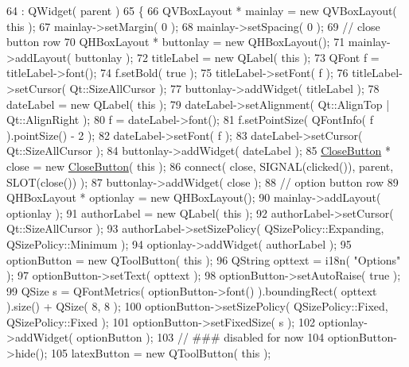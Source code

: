 \begin{DoxyCode}
64       : QWidget( parent )
65     \{
66         QVBoxLayout * mainlay = \textcolor{keyword}{new} QVBoxLayout( \textcolor{keyword}{this} );
67         mainlay->setMargin( 0 );
68         mainlay->setSpacing( 0 );
69         \textcolor{comment}{// close button row}
70         QHBoxLayout * buttonlay = \textcolor{keyword}{new} QHBoxLayout();
71         mainlay->addLayout( buttonlay );
72         titleLabel = \textcolor{keyword}{new} QLabel( \textcolor{keyword}{this} );
73         QFont f = titleLabel->font();
74         f.setBold( \textcolor{keyword}{true} );
75         titleLabel->setFont( f );
76         titleLabel->setCursor( Qt::SizeAllCursor );
77         buttonlay->addWidget( titleLabel );
78         dateLabel = \textcolor{keyword}{new} QLabel( \textcolor{keyword}{this} );
79         dateLabel->setAlignment( Qt::AlignTop | Qt::AlignRight );
80         f = dateLabel->font();
81         f.setPointSize( QFontInfo( f ).pointSize() - 2 );
82         dateLabel->setFont( f );
83         dateLabel->setCursor( Qt::SizeAllCursor );
84         buttonlay->addWidget( dateLabel );
85         \hyperlink{classCloseButton}{CloseButton} * close = \textcolor{keyword}{new} \hyperlink{classCloseButton}{CloseButton}( \textcolor{keyword}{this} );
86         connect( close, SIGNAL(clicked()), parent, SLOT(close()) );
87         buttonlay->addWidget( close );
88         \textcolor{comment}{// option button row}
89         QHBoxLayout * optionlay = \textcolor{keyword}{new} QHBoxLayout();
90         mainlay->addLayout( optionlay );
91         authorLabel = \textcolor{keyword}{new} QLabel( \textcolor{keyword}{this} );
92         authorLabel->setCursor( Qt::SizeAllCursor );
93         authorLabel->setSizePolicy( QSizePolicy::Expanding, QSizePolicy::Minimum );
94         optionlay->addWidget( authorLabel );
95         optionButton = \textcolor{keyword}{new} QToolButton( \textcolor{keyword}{this} );
96         QString opttext = i18n( \textcolor{stringliteral}{"Options"} );
97         optionButton->setText( opttext );
98         optionButton->setAutoRaise( \textcolor{keyword}{true} );
99         QSize s = QFontMetrics( optionButton->font() ).boundingRect( opttext ).size() + QSize( 8, 8 );
100         optionButton->setSizePolicy( QSizePolicy::Fixed, QSizePolicy::Fixed );
101         optionButton->setFixedSize( s );
102         optionlay->addWidget( optionButton );
103         \textcolor{comment}{// ### disabled for now}
104         optionButton->hide();
105         latexButton = \textcolor{keyword}{new} QToolButton( \textcolor{keyword}{this} );

\end{DoxyCode}
